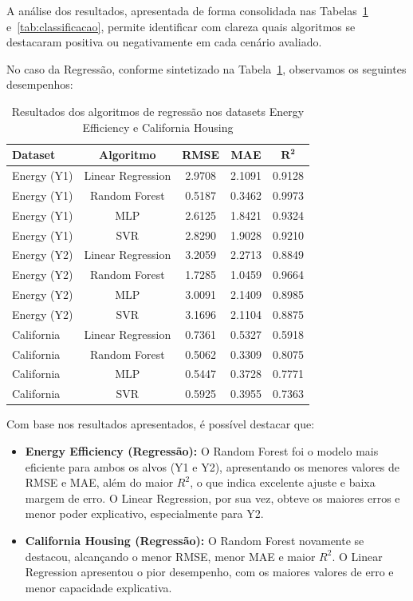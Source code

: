 A análise dos resultados, apresentada de forma consolidada nas Tabelas~\ref{tab:regressao} e~\ref{tab:classificacao}, permite identificar com clareza quais algoritmos se destacaram positiva ou negativamente em cada cenário avaliado.

No caso da Regressão, conforme sintetizado na Tabela~\ref{tab:regressao}, observamos os seguintes desempenhos:

\begin{table}[ht]
    \centering
    \caption{Resultados dos algoritmos de regressão nos datasets Energy Efficiency e California Housing}
    \label{tab:regressao}
    \begin{tabular}{lcccc}
        \toprule
        \textbf{Dataset} & \textbf{Algoritmo} & \textbf{RMSE} & \textbf{MAE} & $\mathbf{R^2}$ \\
        \midrule
        Energy (Y1) & Linear Regression & 2.9708 & 2.1091 & 0.9128 \\
        Energy (Y1) & Random Forest & 0.5187 & 0.3462 & 0.9973 \\
        Energy (Y1) & MLP & 2.6125 & 1.8421 & 0.9324 \\
        Energy (Y1) & SVR & 2.8290 & 1.9028 & 0.9210 \\
        Energy (Y2) & Linear Regression & 3.2059 & 2.2713 & 0.8849 \\
        Energy (Y2) & Random Forest & 1.7285 & 1.0459 & 0.9664 \\
        Energy (Y2) & MLP & 3.0091 & 2.1409 & 0.8985 \\
        Energy (Y2) & SVR & 3.1696 & 2.1104 & 0.8875 \\
        California & Linear Regression & 0.7361 & 0.5327 & 0.5918 \\
        California & Random Forest & 0.5062 & 0.3309 & 0.8075 \\
        California & MLP & 0.5447 & 0.3728 & 0.7771 \\
        California & SVR & 0.5925 & 0.3955 & 0.7363 \\
        \bottomrule
    \end{tabular}
\end{table}

Com base nos resultados apresentados, é possível destacar que:

\begin{itemize}
    \item \textbf{Energy Efficiency (Regressão):} O Random Forest foi o modelo mais eficiente para ambos os alvos (Y1 e Y2), apresentando os menores valores de RMSE e MAE, além do maior $R^2$, o que indica excelente ajuste e baixa margem de erro. O Linear Regression, por sua vez, obteve os maiores erros e menor poder explicativo, especialmente para Y2.
    \item \textbf{California Housing (Regressão):} O Random Forest novamente se destacou, alcançando o menor RMSE, menor MAE e maior $R^2$. O Linear Regression apresentou o pior desempenho, com os maiores valores de erro e menor capacidade explicativa.
\end{itemize}

